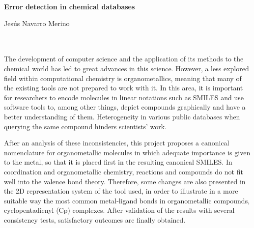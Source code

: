 \cleardoublepage


\thispagestyle{empty}


\begin{center}
{\large\bfseries Error detection in chemical databases}\\
\end{center}
\begin{center}
Jesús Navarro Merino\\
\end{center}

\\

\vspace{0.7cm}
\\

The development of computer science and the application of its methods to the chemical world has led to great advances in this science. However, a less explored field within computational chemistry is organometallics, meaning that many of the existing tools are not prepared to work with it. In this area, it is important for researchers to encode molecules in linear notations such as SMILES and use software tools to, among other things, depict compounds graphically and have a better understanding of them. Heterogeneity in various public databases when querying the same compound hinders scientists' work.

After an analysis of these inconsistencies, this project proposes a canonical nomenclature for organometallic molecules in which adequate importance is given to the metal, so that it is placed first in the resulting canonical SMILES. In coordination and organometallic chemistry, reactions and compounds do not fit well into the valence bond theory. Therefore, some changes are also presented in the 2D representation system of the tool used, in order to illustrate in a more suitable way the most common metal-ligand bonds in organometallic compounds, cyclopentadienyl (Cp) complexes. After validation of the results with several consistency tests, satisfactory outcomes are finally obtained.

\chapter*{}
\thispagestyle{empty}

